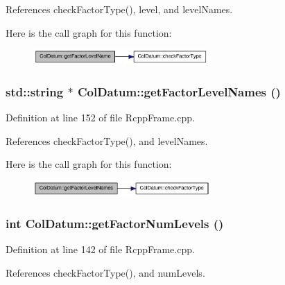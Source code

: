 References checkFactorType(), level, and levelNames.

Here is the call graph for this function:\nopagebreak
\begin{figure}[H]
\begin{center}
\leavevmode
\includegraphics[width=189pt]{classColDatum_a012df5970083052c2348cbda9ed646bb_cgraph}
\end{center}
\end{figure}
\hypertarget{classColDatum_ad1475edb787c82605aec56dbcdf5bac8}{
\subsubsection[{getFactorLevelNames}]{\setlength{\rightskip}{0pt plus 5cm}std::string $\ast$ ColDatum::getFactorLevelNames ()}}
\label{classColDatum_ad1475edb787c82605aec56dbcdf5bac8}


Definition at line 152 of file RcppFrame.cpp.

References checkFactorType(), and levelNames.

Here is the call graph for this function:\nopagebreak
\begin{figure}[H]
\begin{center}
\leavevmode
\includegraphics[width=191pt]{classColDatum_ad1475edb787c82605aec56dbcdf5bac8_cgraph}
\end{center}
\end{figure}
\hypertarget{classColDatum_a9b5db8254be428e68c61805f02723821}{
\subsubsection[{getFactorNumLevels}]{\setlength{\rightskip}{0pt plus 5cm}int ColDatum::getFactorNumLevels ()}}
\label{classColDatum_a9b5db8254be428e68c61805f02723821}


Definition at line 142 of file RcppFrame.cpp.

References checkFactorType(), and numLevels.

